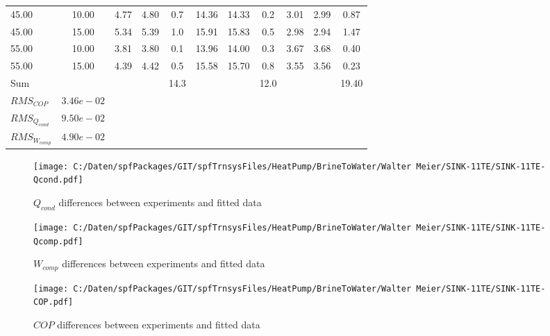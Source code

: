 \documentclass[english]{SPFShortReport}
\begin{document}
\begin{table}[!ht]
\begin{small}
\begin{center}
{\begin{tabular}{l | c c c c c c c c c c }
45.00  & 10.00 & 4.77 & 4.80 & 0.7 & 14.36 & 14.33 & 0.2 & 3.01 & 2.99 & 0.87\\ 
45.00  & 15.00 & 5.34 & 5.39 & 1.0 & 15.91 & 15.83 & 0.5 & 2.98 & 2.94 & 1.47\\ 
55.00  & 10.00 & 3.81 & 3.80 & 0.1 & 13.96 & 14.00 & 0.3 & 3.67 & 3.68 & 0.40\\ 
55.00  & 15.00 & 4.39 & 4.42 & 0.5 & 15.58 & 15.70 & 0.8 & 3.55 & 3.56 & 0.23\\ 
\hline 
 Sum &  & &  & 14.3 &  &  & 12.0 & &  & 19.40\\ 
\hline 
 $RMS_{COP}$ & $3.46e-02$ \\ 
 $RMS_{Q_{cond}}$ & $9.50e-02$ \\ 
 $RMS_{W_{comp}}$ & $4.90e-02$ \\ 
\hline
\hline
\end{tabular}
}
\label{ErrorsTable}
\end{center}
\end{small}
\end{table}
\begin{figure}[!ht]
\begin{center}
\texttt{[image: C:/Daten/spfPackages/GIT/spfTrnsysFiles/HeatPump/BrineToWater/Walter Meier/SINK-11TE/SINK-11TE-Qcond.pdf]}
\caption{$Q_{cond}$ differences between experiments and fitted data}
\label{QcongFig}
\end{center}
\end{figure}
\begin{figure}[!ht]
\begin{center}
\texttt{[image: C:/Daten/spfPackages/GIT/spfTrnsysFiles/HeatPump/BrineToWater/Walter Meier/SINK-11TE/SINK-11TE-Qcomp.pdf]}
\caption{$W_{comp}$ differences between experiments and fitted data}
\label{QcompFig}
\end{center}
\end{figure}
\begin{figure}[!ht]
\begin{center}
\texttt{[image: C:/Daten/spfPackages/GIT/spfTrnsysFiles/HeatPump/BrineToWater/Walter Meier/SINK-11TE/SINK-11TE-COP.pdf]}
\caption{$COP$ differences between experiments and fitted data}
\label{COPFig}
\end{center}
\end{figure}
\end{document}
